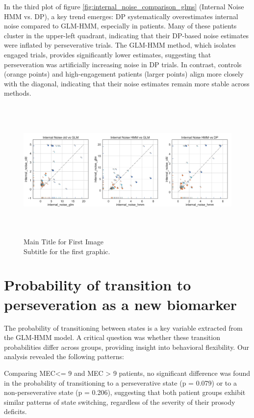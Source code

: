 In the third plot of figure \ref{fig:internal_noise_comparison_glms} (Internal Noise HMM vs. DP), a key trend emerges: DP systematically overestimates internal noise compared to GLM-HMM, especially in patients. Many of these patients cluster in the upper-left quadrant, indicating that their DP-based noise estimates were inflated by perseverative trials. The GLM-HMM method, which isolates engaged trials, provides significantly lower estimates, suggesting that perseveration was artificially increasing noise in DP trials. In contrast, controls (orange points) and high-engagement patients (larger points) align more closely with the diagonal, indicating that their noise estimates remain more stable across methods.
\begin{figure}[H]
    \centering
    \includegraphics[width=17cm,height=7cm]{MainLayout/Images/chapter8/internal_noise_comparison_types_glms.jpg}
    \caption{Main Title for First Image \\ \small Subtitle for the first graphic.}
    \label{fig:internal_noise_comparison_types_glms}
\end{figure}
\section{Probability of transition to perseveration as a new biomarker} 
The probability of transitioning between states is a key variable extracted from the GLM-HMM model. A critical question was whether these transition probabilities differ across groups, providing insight into behavioral flexibility. Our analysis revealed the following patterns:

Comparing MEC<= 9 and MEC > 9 patients, no significant difference was found in the probability of transitioning to a perseverative state (p = 0.079) or to a non-perseverative state (p = 0.206), suggesting that both patient groups exhibit similar patterns of state switching, regardless of the severity of their prosody deficits.

